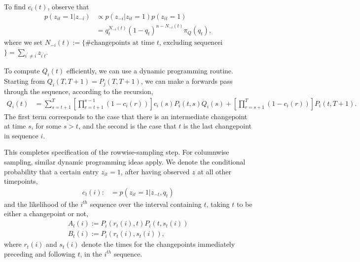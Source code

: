 \documentclass{article}
\begin{document}
To find $c_{i}\left(t\right)$, observe that
\begin{align*}
  p\left(z_{it} = 1 \vert z_{-i}\right) &\propto p\left(z_{-i} \vert z_{it} = 1\right) p\left(z_{it} = 1\right) \\
  &= q_{t}^{N_{-i}\left(t\right)} \left(1 - q_{t}\right)^{n - N_{-i}\left(t\right)} \pi_{Q}\left(q_{t}\right),
\end{align*}
where we set $N_{-i}\left(t\right) := \{\# \text{changepoints at time $t$,
excluding sequence} $i$\} = \sum_{i^\prime \neq i} z_{i^\prime t}$.

To compute $Q_{i}\left(t\right)$ efficiently, we can use a dynamic programming
routine. Starting from $Q_{i}\left(T, T + 1\right) = P_{j}\left(T, T +
1\right)$, we can make a forwards pass through the sequence, according to the
recursion,
\begin{align*}
  Q_{i}\left(t\right) &= \sum_{s = t + 1}^{T} \left[\prod_{r = t + 1}^{s - 1} \left(1 - c_{i}\left(r\right)\right)\right]c_{i}\left(s\right)P_{i}\left(t, s\right)Q_{i}\left(s\right) +
  \left[\prod_{r = s + 1}^{T}\left(1 - c_{i}\left(r\right)\right)\right]P_{i}\left(t, T + 1\right).
\end{align*}
The first term corresponds to the case that there is an intermediate changepoint
at time $s$, for some $s > t$, and the second is the case that $t$ is the last
changepoint in sequence $i$.

This completes specification of the rowwise-sampling step. For columnwise
sampling, similar dynamic programming ideas apply. We denote the
conditional probability that a certain entry $z_{it} = 1$, after having observed
$z$ at all other timepoints,
\begin{align*}
  c_{t}\left(i\right) :&= p\left(z_{it} = 1 \vert z_{-t}, q_{t}\right)
\end{align*}
and the likelihood of the $i^{th}$ sequence over the interval containing $t$,
taking $t$ to be either a changepoint or not,
\begin{align*}
  A_{t}\left(i\right) := P_{i}\left(r_{t}\left(i\right), t\right)P_{i}\left(t, s_{t}\left(i\right)\right) \\
  B_{t}\left(i\right) := P_{i}\left(r_{t}\left(i\right), s_{t}\left(i\right)\right),
\end{align*}
where $r_{t}\left(i\right)$ and $s_{t}\left(i\right)$ denote the times for the
changepoints immediately preceding and following $t$, in the $i^{th}$ sequence.
\end{document}
